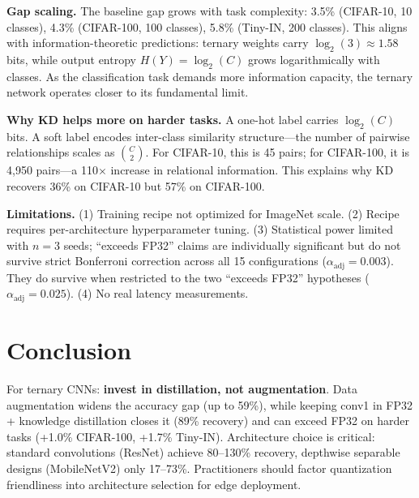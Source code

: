 \documentclass[10pt]{article}
\begin{document}
\textbf{Gap scaling.} The baseline gap grows with task complexity: 3.5\% (CIFAR-10, 10 classes), 4.3\% (CIFAR-100, 100 classes), 5.8\% (Tiny-IN, 200 classes). This aligns with information-theoretic predictions: ternary weights carry $\log_2(3) \approx 1.58$ bits, while output entropy $H(Y) = \log_2(C)$ grows logarithmically with classes. As the classification task demands more information capacity, the ternary network operates closer to its fundamental limit.

\textbf{Why KD helps more on harder tasks.} A one-hot label carries $\log_2(C)$ bits. A soft label encodes inter-class similarity structure---the number of pairwise relationships scales as $\binom{C}{2}$. For CIFAR-10, this is 45 pairs; for CIFAR-100, it is 4,950 pairs---a 110$\times$ increase in relational information. This explains why KD recovers 36\% on CIFAR-10 but 57\% on CIFAR-100.

\textbf{Limitations.} (1) Training recipe not optimized for ImageNet scale. (2) Recipe requires per-architecture hyperparameter tuning. (3) Statistical power limited with $n=3$ seeds; ``exceeds FP32'' claims are individually significant but do not survive strict Bonferroni correction across all 15 configurations ($\alpha_{\text{adj}}=0.003$). They do survive when restricted to the two ``exceeds FP32'' hypotheses ($\alpha_{\text{adj}}=0.025$). (4) No real latency measurements.

\section{Conclusion}

For ternary CNNs: \textbf{invest in distillation, not augmentation}. Data augmentation widens the accuracy gap (up to 59\%), while keeping conv1 in FP32 + knowledge distillation closes it (89\% recovery) and can exceed FP32 on harder tasks (+1.0\% CIFAR-100, +1.7\% Tiny-IN). Architecture choice is critical: standard convolutions (ResNet) achieve 80--130\% recovery, depthwise separable designs (MobileNetV2) only 17--73\%. Practitioners should factor quantization friendliness into architecture selection for edge deployment.


\end{document}
